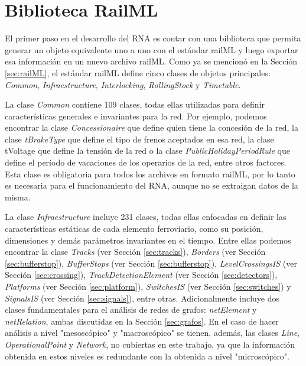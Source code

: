 \section{Biblioteca RailML}
	\label{sec:Biblioteca}
	
    El primer paso en el desarrollo del RNA es contar con una biblioteca que permita generar un objeto equivalente uno a uno con el estándar railML y luego exportar esa información en un nuevo archivo railML. Como ya se mencionó en la Sección \ref{sec:railML}, el estándar railML define cinco clases de objetos principales: \textit{Common}, \textit{Infraestructure}, \textit{Interlocking}, \textit{RollingStock} y \textit{Timetable}. 

    La clase \textit{Common} contiene 109 clases, todas ellas utilizadas para definir características generales e invariantes para la red. Por ejemplo, podemos encontrar la clase \textit{Concessionaire} que define quien tiene la concesión de la red, la clase \textit{tBrakeType} que define el tipo de frenos aceptados en esa red, la clase tVoltage que define la tensión de la red o la clase \textit{PublicHolidayPeriodRule} que define el período de vacaciones de los operarios de la red, entre otros factores. Esta clase es obligatoria para todos los archivos en formato railML, por lo tanto es necesaria para el funcionamiento del RNA, aunque no se extraigan datos de la misma.

    La clase \textit{Infraestructure} incluye  231 clases, todas ellas enfocadas en definir las características estáticas de cada elemento ferroviario, como su posición, dimensiones y demás parámetros invariantes en el tiempo. Entre ellas podemos encontrar la clase \textit{Tracks} (ver Sección \ref{sec:tracks}), \textit{Borders} (ver Sección \ref{sec:bufferstop}), \textit{BufferStops} (ver Sección \ref{sec:bufferstop}), \textit{LevelCrossingsIS} (ver Sección \ref{sec:crossing}), \textit{TrackDetectionElement} (ver Sección \ref{sec:detectors}), \textit{Platforms} (ver Sección \ref{sec:platform}), \textit{SwitchesIS} (ver Sección \ref{sec:switches}) y \textit{SignalsIS} (ver Sección \ref{sec:signals}), entre otras. Adicionalmente incluye dos clases fundamentales para el análisis de redes de grafos: \textit{netElement} y \textit{netRelation}, ambas discutidas en la Sección \ref{sec:grafos}. En el caso de hacer análisis a nivel "mesoscópico" y "macroscópico" se tienen, además, las clases \textit{Line}, \textit{OperationalPoint} y \textit{Network}, no cubiertas en este trabajo, ya que la información obtenida en estos niveles es redundante con la obtenida a nivel "microscópico".
	
